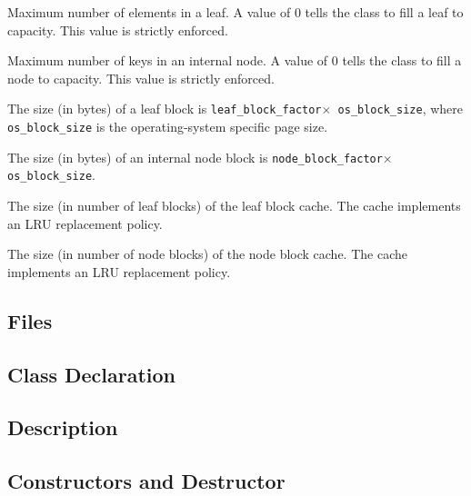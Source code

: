    {Maximum number of elements in a leaf. A
  value of $0$ tells the class to fill a leaf to capacity. This value is
  strictly enforced.}

   {Maximum number of keys in an internal
  node. A value of $0$ tells the class to fill a node to capacity. This
  value is strictly enforced.}

   {The size (in bytes) of a leaf block
  is {\tt leaf\_block\_factor$\times$ os\_block\_size}, where {\tt
  os\_block\_size} is the operating-system specific page size.}

   {The size (in bytes) of an internal
  node block is {\tt node\_block\_factor$\times$ os\_block\_size}.}

   {The size (in number of leaf blocks) of
  the leaf block cache. The cache implements an LRU replacement policy.}

   {The size (in number of node blocks) of
  the node block cache. The cache implements an LRU replacement policy.}

\etabb
{}


\subsection{Files}
   \btabb
       {}
   \etabb

\subsection{Class Declaration}
   \btabb
       {}
   \etabb

\subsection{Description}

\subsection{Constructors and Destructor}
   \btabb
   \etabb

